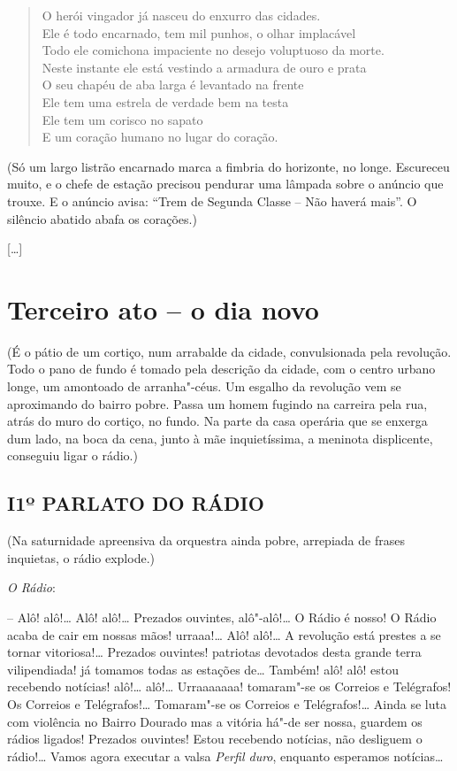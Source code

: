 \begin{verse}
O herói vingador já nasceu do enxurro das cidades.\\
Ele é todo encarnado, tem mil punhos, o olhar implacável\\
Todo ele comichona impaciente no desejo voluptuoso da morte.\\
Neste instante ele está vestindo a armadura de ouro e prata\\
O seu chapéu de aba larga é levantado na frente\\
Ele tem uma estrela de verdade bem na testa\\
Ele tem um corisco no sapato\\
E um coração humano no lugar do coração.
\end{verse}

\hfill\parbox{150pt}{
(Só um largo listrão encarnado marca a fimbria do horizonte, no longe.
Escureceu muito, e o chefe de estação precisou pendurar uma lâmpada
sobre o anúncio que trouxe. E o anúncio avisa: ``Trem de Segunda Classe
-- Não haverá mais''. O silêncio abatido abafa os corações.)
}

{[}\ldots{}{]}

\chapter{Terceiro ato -- o dia novo}

\hfill\parbox{150pt}{
(É o pátio de um cortiço, num arrabalde da cidade, convulsionada pela
revolução. Todo o pano de fundo é tomado pela descrição da cidade, com o
centro urbano longe, um amontoado de arranha"-céus. Um esgalho da
revolução vem se aproximando do bairro pobre. Passa um homem fugindo na
carreira pela rua, atrás do muro do cortiço, no fundo. Na parte da casa
operária que se enxerga dum lado, na boca da cena, junto à mãe
inquietíssima, a meninota displicente, conseguiu ligar o rádio.)
}

\section*{I\break 1º PARLATO DO RÁDIO}

\hfill\parbox{150pt}{
(Na saturnidade apreensiva da orquestra ainda pobre, arrepiada de frases
inquietas, o rádio explode.)
}

\emph{O Rádio}:

-- Alô! alô!\ldots{} Alô! alô!\ldots{} Prezados ouvintes, alô"-alô!\ldots{} O
Rádio é nosso! O Rádio acaba de cair em nossas mãos! urraaa!\ldots{} Alô!
alô!\ldots{} A revolução está prestes a se tornar vitoriosa!\ldots{} Prezados
ouvintes! patriotas devotados desta grande terra vilipendiada! já
tomamos todas as estações de\ldots{} Também! alô! alô! estou recebendo
notícias! alô!\ldots{} alô!\ldots{} Urraaaaaaa! tomaram"-se os Correios e
Telégrafos! Os Correios e Telégrafos!\ldots{} Tomaram"-se os Correios e
Telégrafos!\ldots{} Ainda se luta com violência no Bairro Dourado mas a
vitória há"-de ser nossa, guardem os rádios ligados! Prezados ouvintes!
Estou recebendo notícias, não desliguem o rádio!\ldots{} Vamos agora executar
a valsa \emph{Perfil duro}, enquanto esperamos notícias\ldots{}

